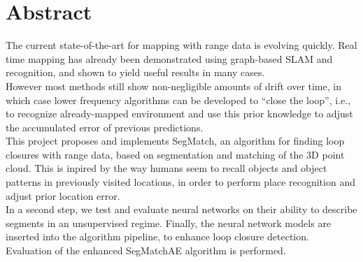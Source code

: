 \chapter*{Abstract}

The current state-of-the-art for mapping with range data is evolving quickly. Real time mapping has already been demonstrated using graph-based SLAM and recognition, and shown to yield useful results in many cases.\\

However most methods still show non-negligible amounts of drift over time, in which case lower frequency algorithms can be developed to “close the loop”, i.e., to recognize already-mapped environment and use this prior knowledge to adjust the accumulated error of previous predictions.\\

This project proposes and implements SegMatch, an algorithm for finding loop closures with range data, based on segmentation and matching of the 3D point cloud. This is inpired by the way humans seem to recall objects and object patterns in previously visited locations, in order to perform place recognition and adjust prior location error.\\

In a second step, we test and evaluate neural networks on their ability to describe segments in an unsupervised regime. Finally, the neural network models are inserted into the algorithm pipeline, to enhance loop closure detection. Evaluation of the enhanced SegMatchAE algorithm is performed.\\
